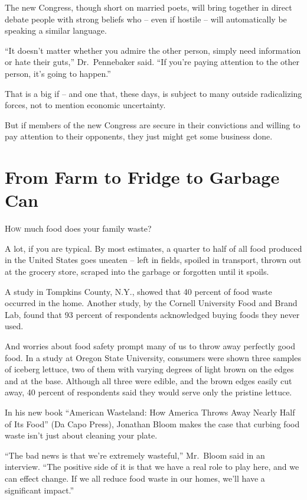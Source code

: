 ﻿\documentclass[12pt]{article}
\begin{document}
The new Congress, though short on married poets, will bring together in direct debate people with
strong beliefs who -- even if hostile -- will automatically be speaking a similar language.

``It doesn't matter whether you admire the other person, simply need information or hate their
guts,'' Dr.~Pennebaker said. ``If you're paying attention to the other person, it's going to
happen.''

That is a big if -- and one that, these days, is subject to many outside radicalizing forces, not to
mention economic uncertainty.

But if members of the new Congress are secure in their convictions and willing to pay attention to
their opponents, they just might get some business done.

\section{From Farm to Fridge to Garbage Can}

\lettrine{H}{ow} much food does your family waste?

A lot, if you are typical. By most estimates, a quarter to half of all food produced in the United
States goes uneaten -- left in fields, spoiled in transport, thrown out at the grocery store,
scraped into the garbage or forgotten until it spoils.

A study in Tompkins County, N.Y., showed that 40 percent of food waste occurred in the home. Another
study, by the Cornell University Food and Brand Lab, found that 93 percent of respondents
acknowledged buying foods they never used.

And worries about food safety prompt many of us to throw away perfectly good food. In a study at
Oregon State University, consumers were shown three samples of iceberg lettuce, two of them with
varying degrees of light brown on the edges and at the base. Although all three were edible, and the
brown edges easily cut away, 40 percent of respondents said they would serve only the pristine
lettuce.

In his new book ``American Wasteland: How America Throws Away Nearly Half of Its Food'' (Da Capo
Press), Jonathan Bloom makes the case that curbing food waste isn't just about cleaning your plate.

``The bad news is that we're extremely wasteful,'' Mr.~Bloom said in an interview. ``The positive
side of it is that we have a real role to play here, and we can effect change. If we all reduce food
waste in our homes, we'll have a significant impact.''
\end{document}

